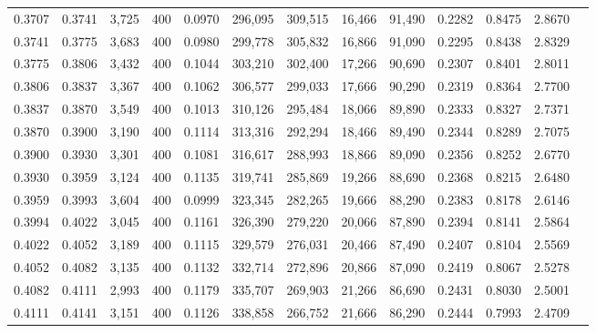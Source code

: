 \begin{tabular}{rrrrrrrrrrrrr}
0.3707 & 0.3741 &  3,725 & 400 &                                     0.0970 & 296,095 & 309,515 &  16,466 &  91,490 & 0.2282 & 0.8475 & 2.8670 \\
0.3741 & 0.3775 &  3,683 & 400 &                                     0.0980 & 299,778 & 305,832 &  16,866 &  91,090 & 0.2295 & 0.8438 & 2.8329 \\
0.3775 & 0.3806 &  3,432 & 400 &                                     0.1044 & 303,210 & 302,400 &  17,266 &  90,690 & 0.2307 & 0.8401 & 2.8011 \\
0.3806 & 0.3837 &  3,367 & 400 &                                     0.1062 & 306,577 & 299,033 &  17,666 &  90,290 & 0.2319 & 0.8364 & 2.7700 \\
0.3837 & 0.3870 &  3,549 & 400 &                                     0.1013 & 310,126 & 295,484 &  18,066 &  89,890 & 0.2333 & 0.8327 & 2.7371 \\
0.3870 & 0.3900 &  3,190 & 400 &                                     0.1114 & 313,316 & 292,294 &  18,466 &  89,490 & 0.2344 & 0.8289 & 2.7075 \\
0.3900 & 0.3930 &  3,301 & 400 &                                     0.1081 & 316,617 & 288,993 &  18,866 &  89,090 & 0.2356 & 0.8252 & 2.6770 \\
0.3930 & 0.3959 &  3,124 & 400 &                                     0.1135 & 319,741 & 285,869 &  19,266 &  88,690 & 0.2368 & 0.8215 & 2.6480 \\
0.3959 & 0.3993 &  3,604 & 400 &                                     0.0999 & 323,345 & 282,265 &  19,666 &  88,290 & 0.2383 & 0.8178 & 2.6146 \\
0.3994 & 0.4022 &  3,045 & 400 &                                     0.1161 & 326,390 & 279,220 &  20,066 &  87,890 & 0.2394 & 0.8141 & 2.5864 \\
0.4022 & 0.4052 &  3,189 & 400 &                                     0.1115 & 329,579 & 276,031 &  20,466 &  87,490 & 0.2407 & 0.8104 & 2.5569 \\
0.4052 & 0.4082 &  3,135 & 400 &                                     0.1132 & 332,714 & 272,896 &  20,866 &  87,090 & 0.2419 & 0.8067 & 2.5278 \\
0.4082 & 0.4111 &  2,993 & 400 &                                     0.1179 & 335,707 & 269,903 &  21,266 &  86,690 & 0.2431 & 0.8030 & 2.5001 \\
0.4111 & 0.4141 &  3,151 & 400 &                                     0.1126 & 338,858 & 266,752 &  21,666 &  86,290 & 0.2444 & 0.7993 & 2.4709 \\

\end{tabular}
